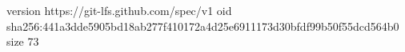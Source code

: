 version https://git-lfs.github.com/spec/v1
oid sha256:441a3dde5905bd18ab277f410172a4d25e6911173d30bfdf99b50f55dcd564b0
size 73
